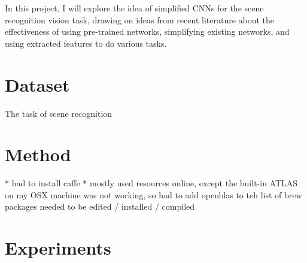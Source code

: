 \documentclass[10pt]{article}
\begin{document}
In this project, I will explore the idea of simplified CNNs for the scene recognition vision task, drawing on ideas from recent literature about the effectiveness of using pre-trained networks, simplifying existing networks, and using extracted features to do various tasks. 

\section{Dataset}

The task of scene recognition 




\section{Method}

* had to install caffe
* mostly used resources online, except the built-in ATLAS on my OSX machine was not working, so had to add openblas to teh list of brew packages needed to be edited / installed / compiled

\section{Experiments}





\end{document}
